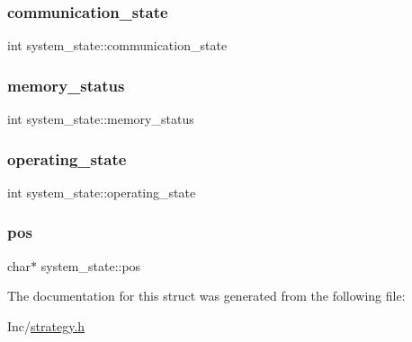 \subsubsection{\texorpdfstring{communication\+\_\+state}{communication\_state}}
{\footnotesize\ttfamily int system\+\_\+state\+::communication\+\_\+state}

\mbox{\label{structsystem__state_ab361eff610b853cc61392ff6a608687d}} 
\subsubsection{\texorpdfstring{memory\+\_\+status}{memory\_status}}
{\footnotesize\ttfamily int system\+\_\+state\+::memory\+\_\+status}

\mbox{\label{structsystem__state_a0a9a175c3932a1454451380007771f0d}} 
\subsubsection{\texorpdfstring{operating\+\_\+state}{operating\_state}}
{\footnotesize\ttfamily int system\+\_\+state\+::operating\+\_\+state}

\mbox{\label{structsystem__state_a025b72e1efd0199dd93a1265affda3aa}} 
\subsubsection{\texorpdfstring{pos}{pos}}
{\footnotesize\ttfamily char$\ast$ system\+\_\+state\+::pos}



The documentation for this struct was generated from the following file\+:\begin{DoxyCompactItemize}
\item 
Inc/\hyperlink{strategy_8h}{strategy.\+h}\end{DoxyCompactItemize}
